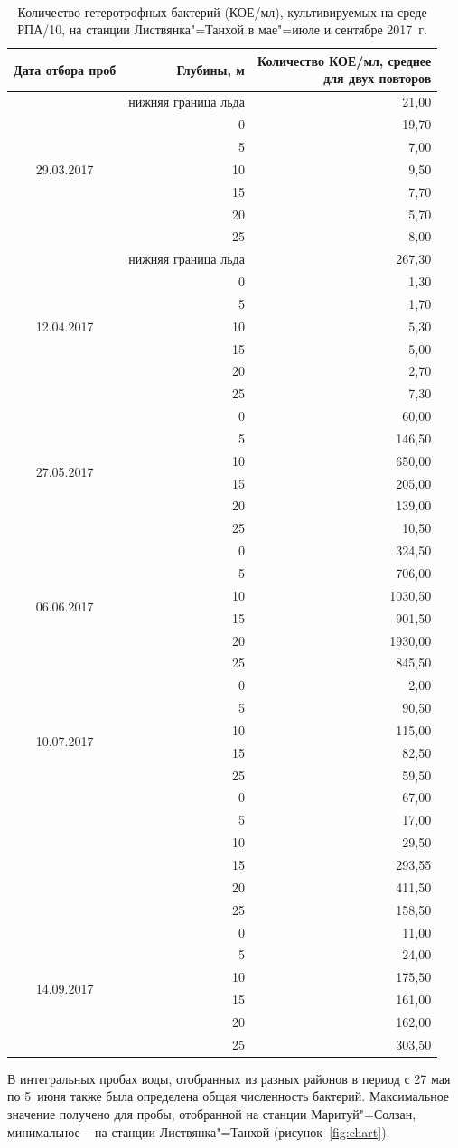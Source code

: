 \documentclass[a4paper,12pt,openany,final]{extreport}
\def\oldcaption{} \let\oldcaption=\caption
\def\caption{\stepcounter{captionsnum}\oldcaption}
\newcommand\T{\rule{0pt}{2.6ex}}       %
\newcommand{\BC}[2]{%
  \begin{minipage}[c]{#1}
    \raggedright\T
    #2
  \end{minipage}
}
\begin{document}
\begin{table}
  \caption{Количество гетеротрофных бактерий (КОЕ/мл), культивируемых на среде РПА/10, на станции Листвянка"=Танхой в мае"=июле и сентябре 2017~г.}\label{table:2}

{\tt\small%
  \setlength{\extrarowheight}{-0.2em}
  \begin{tabular*}{\textwidth}{|c|r|@{\extracolsep{\fill}}r|}
\hline
\rm Дата отбора проб & \BC{4cm}{\centering\rm Глубины, м} & \BC{0.45\textwidth}{\rm\centering Количество КОЕ/мл, среднее\\[-0.2em] для двух
повторов}\\
\hline
\multirow{7}{*}{29.03.2017} & \rm нижняя граница льда & 21,00\tabularnewline
& 0 & 19,70\tabularnewline
& 5 & 7,00\tabularnewline
& 10 & 9,50\tabularnewline
& 15 & 7,70\tabularnewline
& 20 & 5,70\tabularnewline
  & 25 & 8,00\tabularnewline
         \hline
\multirow{7}{*}{12.04.2017} & \rm нижняя граница льда & 267,30\tabularnewline
& 0 & 1,30\tabularnewline
& 5 & 1,70\tabularnewline
& 10 & 5,30\tabularnewline
& 15 & 5,00\tabularnewline
& 20 & 2,70\tabularnewline
  & 25 & 7,30\tabularnewline
         \hline
\multirow{6}{*}{27.05.2017} & 0 & 60,00\tabularnewline
& 5 & 146,50\tabularnewline
& 10 & 650,00\tabularnewline
& 15 & 205,00\tabularnewline
& 20 & 139,00\tabularnewline
& 25 & 10,50\tabularnewline
         \hline
\multirow{6}{*}{06.06.2017} & 0 & 324,50\tabularnewline
& 5 & 706,00\tabularnewline
& 10 & 1030,50\tabularnewline
& 15 & 901,50\tabularnewline
& 20 & 1930,00\tabularnewline
& 25 & 845,50\tabularnewline
         \hline
\multirow{6}{*}{10.07.2017} & 0 & 2,00\tabularnewline
& 5 & 90,50\tabularnewline
& 10 & 115,00\tabularnewline
& 15 & 82,50\tabularnewline
& 25 & 59,50\tabularnewline
         \hline
\multirow{6}{*}{03.09.2017} & 0 & 67,00\tabularnewline
& 5 & 17,00\tabularnewline
& 10 & 29,50\tabularnewline
& 15 & 293,55\tabularnewline
& 20 & 411,50\tabularnewline
& 25 & 158,50\tabularnewline
         \hline
\multirow{6}{*}{14.09.2017} & 0 & 11,00\tabularnewline
& 5 & 24,00\tabularnewline
& 10 & 175,50\tabularnewline
& 15 & 161,00\tabularnewline
& 20 & 162,00\tabularnewline
& 25 & 303,50\tabularnewline
\hline
\end{tabular*}}
\end{table}

В интегральных пробах воды, отобранных из разных районов в период с 27 мая по 5~июня также была определена общая численность бактерий.  Максимальное значение получено для пробы, отобранной на станции Маритуй"=Солзан, минимальное -- на станции Листвянка"=Танхой (рисунок~\ref{fig:chart}).
\end{document}
